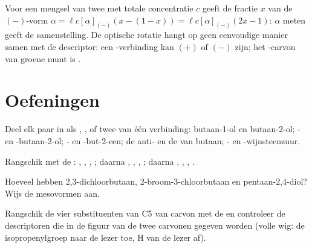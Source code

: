 Voor een mengsel van twee  met totale concentratie $c$ geeft
de fractie $x$ van de $(-)$-vorm $\alpha = \ell c[\alpha]_{(-)}(x - (1 - x)) =
\ell c[\alpha]_{(-)}(2x - 1)$: $\alpha$ meten geeft de samenstelling. De
optische rotatie hangt op geen eenvoudige manier samen met de
descriptor: een -verbinding kan $(+)$ of $(-)$ zijn; het
-carvon van groene munt is .

\section{Oefeningen}

\begin{exercise}[$\star$]\label{exo:b1:stereochemistry-in-depth:1}
Deel elk paar in als , , 
of twee  van één verbinding: butaan-1-ol en butaan-2-ol;
- en -butaan-2-ol; - en -but-2-een; de
anti- en de  van butaan; - en
-wijnsteenzuur.
\end{exercise}

\begin{exercise}[$\star$]\label{exo:b1:stereochemistry-in-depth:2}
Rangschik met de : , , , ;
daarna , , , ; daarna
, , , .
\end{exercise}

\begin{exercise}[$\star$]\label{exo:b1:stereochemistry-in-depth:3}
Hoeveel  hebben 2,3-dichloorbutaan,
2-broom-3-chloorbutaan en pentaan-2,4-diol? Wijs de mesovormen aan.
\end{exercise}

\begin{exercise}[$\star$]\label{exo:b1:stereochemistry-in-depth:4}
Rangschik de vier substituenten van C5 van carvon met de  en
controleer de descriptoren die in de figuur van de twee carvonen
gegeven worden (volle wig: de isopropenylgroep naar de lezer toe, H van
de lezer af).
\end{exercise}

